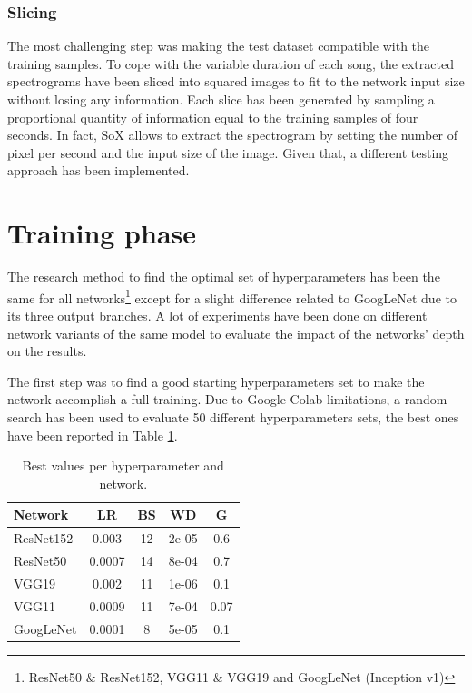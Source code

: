 \documentclass[10pt,twocolumn,letterpaper]{article}
\begin{document}
\subsubsection{Slicing}

The most challenging step was making the test dataset compatible with the training samples. To cope with the variable duration of each song, the extracted spectrograms have been sliced into squared images to fit to the network input size without losing any information. Each slice has been generated by sampling a proportional quantity of information equal to the training samples of four seconds. In fact, SoX allows to extract the spectrogram by setting the number of pixel per second and the input size of the image. Given that, a different testing approach has been implemented.

\section{Training phase}\label{training}

The research method to find the optimal set of hyperparameters has been the same for all networks\footnote {ResNet50 \& ResNet152, VGG11 \& VGG19 and GoogLeNet (Inception v1)} except for a slight difference related to GoogLeNet due to its three output branches. A lot of experiments have been done on different network variants of the same model to evaluate the impact of the networks' depth on the results.

The first step was to find a good starting hyperparameters set to make the network accomplish a full training. Due to Google Colab limitations, a random search has been used to evaluate 50 different hyperparameters sets, the best ones have been reported in Table \ref{tab:sets}.

\begin{table}
   \begin{center}
      \def\arraystretch{1.5}
   \begin{tabular}{l|c|c|c|c}
   \textbf{Network} & \textbf{LR} & \textbf{BS} & \textbf{WD} & \textbf{G} \\
   \hline
   ResNet152 & 0.003 & 12 & 2e-05 & 0.6 \\
   \hline
   ResNet50 & 0.0007 & 14 & 8e-04 & 0.7 \\
   \hline
   VGG19 & 0.002 & 11 & 1e-06 & 0.1 \\
   \hline
   VGG11 & 0.0009 & 11 & 7e-04 & 0.07 \\
   \hline
   GoogLeNet & 0.0001 & 8 & 5e-05 & 0.1 \\
   \end{tabular}
   \end{center}
   \caption{Best values per hyperparameter and network.}
   \label{tab:sets}
   \end{table}
\end{document}
